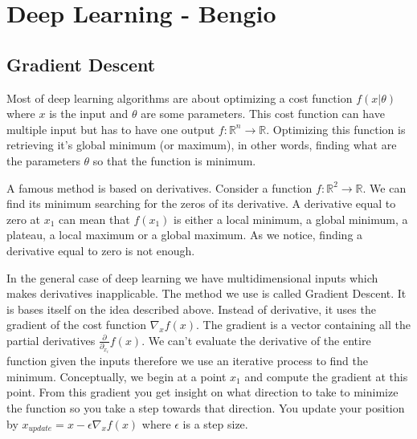 	



\section{Deep Learning - Bengio}
	
	\subsection{Gradient Descent}
		Most of deep learning algorithms are about optimizing a cost function $f(x|\theta)$ where $x$ is the input and $\theta$ are some parameters. This cost function can have multiple input but has to have one output $f:\mathbb{R}^n\rightarrow \mathbb{R}$. Optimizing this function is retrieving it's global minimum (or maximum), in other words, finding what are the parameters $\theta$ so that the function is minimum. 

		A famous method is based on derivatives. Consider a function $f:\mathbb{R}^2 \rightarrow \mathbb{R}$. We can find its minimum searching for the zeros of its derivative. A derivative equal to zero at $x_1$ can mean that $f(x_1)$ is either a local minimum, a global minimum, a plateau, a local maximum or a global maximum. As we notice, finding a derivative equal to zero is not enough.

		In the general case of deep learning we have multidimensional inputs which makes derivatives inapplicable. The method we use is called Gradient Descent. It is bases itself on the idea described above. Instead of derivative, it uses the gradient of the cost function $\nabla_x f(x)$. The gradient is a vector containing all the partial derivatives $\frac{\partial}{\partial_{x_i}}f(x)$. We can't evaluate the derivative of the entire function given the inputs therefore we use an iterative process to find the minimum. Conceptually, we begin at a point $x_1$ and compute the gradient at this point. From this gradient you get insight on what direction to take to minimize the function so you take a step towards that direction. You update your position by $x_{update} = x - \epsilon \nabla_x f(x)$ where $\epsilon$ is a step size.


